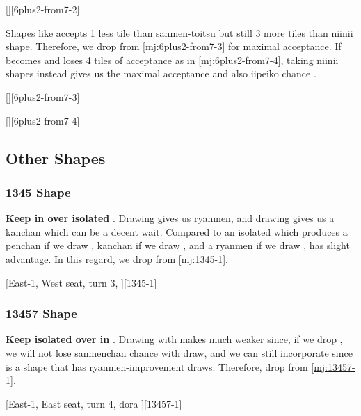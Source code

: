 \documentclass[12pt]{article}
\begin{document}
[][6plus2-from7-2]

Shapes like  accepts 1 less tile than sanmen-toitsu but still 3 more tiles than niinii shape. Therefore, we drop  from \ref{mj:6plus2-from7-3} for maximal acceptance. If  becomes  and loses 4 tiles of acceptance as in \ref{mj:6plus2-from7-4}, taking  niinii shapes instead gives us the maximal acceptance and also iipeiko chance \citep[][p.~133]{uzaku-haikouritsu}.

[][6plus2-from7-3]

[][6plus2-from7-4]


\subsection{Other Shapes}

\subsubsection{1345 Shape}

\textbf{Keep  in  over isolated } \citep{ittaku}. Drawing  gives us  ryanmen, and drawing  gives us a  kanchan which can be a decent wait. Compared to an isolated  which produces a penchan if we draw , kanchan if we draw , and a ryanmen if we draw ,  has slight advantage. In this regard, we drop  from \ref{mj:1345-1}.

[East-1, West seat, turn 3, ][1345-1]

\subsubsection{13457 Shape}

\textbf{Keep isolated  over  in } \citep{ittaku}. Drawing  with  makes  much weaker since, if we drop , we will not lose sanmenchan chance with  draw, and we can still incorporate  since  is a shape that has  ryanmen-improvement draws. Therefore, drop  from \ref{mj:13457-1}.

[East-1, East seat, turn 4, dora ][13457-1]
\end{document}
